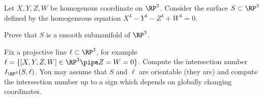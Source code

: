 Let $X,Y,Z,W$ be homogenous coordinate on $\RP^3$. Consider the
surface $S\subset \RP^3$ defined by the homogeneous equation
$X^4-Y^4-Z^4+W^4=0$.
\begin{alist}
\item Prove that $S$ is a smooth submanifold of $\RP^3$.
\item Fix a projective line $\ell\subset \RP^3$, for example
$\ell=\{[X,Y,Z,W]\in \RP^3 \pipe  Z=W=0\}$. Compute the intersection number
$I_{\RP^3}(S,\ell)$. You may assume that $S$ and $\ell$ are orientable
(they are) and compute the intersection number up to a sign which
depends on globally changing coordinates.
\end{alist}

